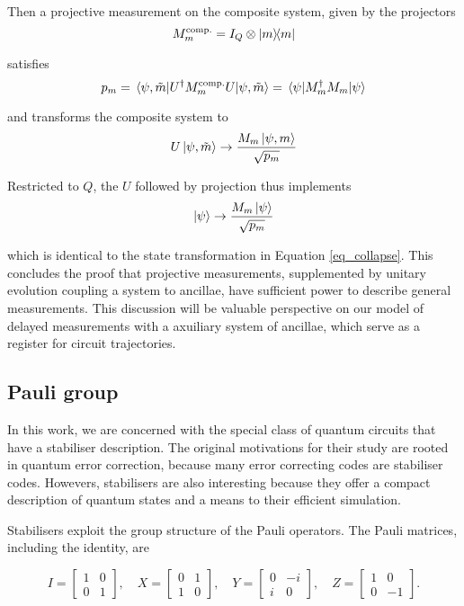 \documentclass[10pt]{article}
\renewcommand{\arraystretch}{1.5}
\begin{document}
Then a projective measurement on the composite system, given by the projectors
\begin{equation}
M_m^{\text{comp.}} = I_Q \otimes \dyad{m}
\end{equation}

satisfies
\begin{equation}
p_m 
= \ev{U^\dagger M_m^{\text{comp.}} U}{\psi, \tilde{m}}
= \ev{M_m^\dagger M_m}{\psi}
\end{equation}

and transforms the composite system to
\begin{equation}
U \ket{\psi, \tilde{m}} \rightarrow \frac{M_m \ket{\psi, m}}{\sqrt{p_m}}
\end{equation}

Restricted to $Q$, the $U$ followed by projection thus implements
\begin{equation}
\ket{\psi} \rightarrow \frac{M_m \ket{\psi}}{\sqrt{p_m}}
\end{equation}

which is identical to the state transformation in Equation \ref{eq_collapse}. This concludes the proof that projective measurements, supplemented by unitary evolution coupling a system to ancillae, have sufficient power to describe general measurements. This discussion will be valuable perspective on our model of delayed measurements with a axuiliary system of ancillae, which serve as a register for circuit trajectories.




\subsection{Pauli group}

In this work, we are concerned with the special class of quantum circuits that have a stabiliser description. The original motivations for their study are rooted in quantum error correction, because many error correcting codes are stabiliser codes. Howevers, stabilisers are also interesting because they offer a compact description of quantum states and a means to their efficient simulation.

Stabilisers exploit the group structure of the Pauli operators. The Pauli matrices, including the identity, are

\renewcommand{\arraystretch}{1}
\begin{equation}
I = \begin{bmatrix} 1 & 0 \\ 0 & 1 \end{bmatrix},
\quad
X = \begin{bmatrix} 0 & 1 \\ 1 & 0 \end{bmatrix},
\quad
Y = \begin{bmatrix} 0 & -i \\ i & 0 \end{bmatrix},
\quad
Z= \begin{bmatrix} 1 & 0 \\ 0 & -1 \end{bmatrix}.
\end{equation}
\renewcommand{\arraystretch}{1.5}
\end{document}
